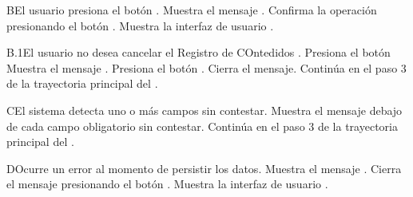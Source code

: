 \begin{UCtrayectoriaA}{B}{El usuario presiona el botón .}
	\UCpaso Muestra el mensaje .
	\UCpaso[\UCactor] Confirma la operación presionando el botón .
	\UCpaso Muestra la interfaz de usuario .
\end{UCtrayectoriaA}

\begin{UCtrayectoriaA}{B.1}{El usuario no desea cancelar el Registro de COntedidos .}
	\UCpaso[\UCactor] Presiona el botón 
	\UCpaso Muestra el mensaje .
	\UCpaso[\UCactor] Presiona el botón .
	\UCpaso Cierra el mensaje.
	\UCpaso Continúa en el paso 3 de la trayectoria principal del .
\end{UCtrayectoriaA}

\begin{UCtrayectoriaA}{C}{El sistema detecta uno o más campos sin contestar.}
	\UCpaso Muestra el mensaje  debajo de cada campo obligatorio sin contestar.
	\UCpaso Continúa en el paso 3 de la trayectoria principal del .
\end{UCtrayectoriaA}

\begin{UCtrayectoriaA}{D}{Ocurre un error al momento de persistir los datos.}
	\UCpaso Muestra el mensaje .
	\UCpaso[\UCactor] Cierra el mensaje presionando el botón .
	\UCpaso Muestra la interfaz de usuario .
\end{UCtrayectoriaA}

